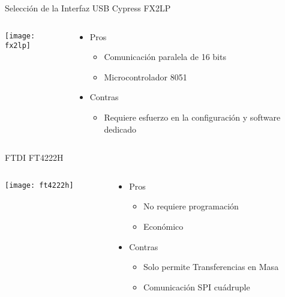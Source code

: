 \begin{frame}{Selección de la Interfaz USB}
	\alert<2>{Cypress FX2LP}
	\begin{columns}
		\begin{column}{.4\textwidth}
			\texttt{[image: fx2lp]}
		\end{column}
		\begin{column}{.6\textwidth}
			\begin{itemize}
				\item Pros
				\begin{itemize}
					\item Comunicación paralela de 16 bits
					\item Microcontrolador 8051
				\end{itemize}
				\item Contras
				\begin{itemize}
					\item Requiere esfuerzo en la configuración y software dedicado
				\end{itemize}
			\end{itemize}
		\end{column}
	\end{columns}
		
	FTDI FT4222H
	\begin{columns}
		\begin{column}{.4\textwidth}
			\texttt{[image: ft4222h]}
		\end{column}
		\begin{column}{.6\textwidth}
			\begin{itemize}
				\item Pros
				\begin{itemize}
					\item No requiere programación
					\item Económico
				\end{itemize}
				\item Contras
				\begin{itemize}
					\item Solo permite Transferencias en Masa
					\item Comunicación SPI cuádruple
				\end{itemize}
			\end{itemize}
		\end{column}
	\end{columns}
\end{frame}

